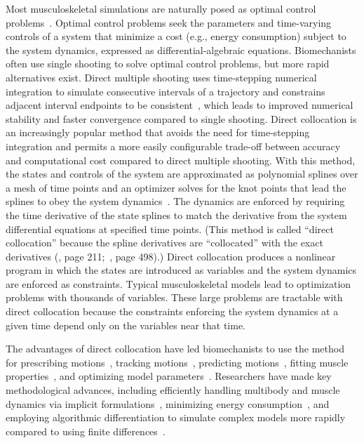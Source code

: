 \documentclass[10pt,letterpaper]{article}
\begin{document}
Most musculoskeletal simulations are naturally posed as optimal control problems~\cite{Todorov:2003}. Optimal control problems seek the parameters and time-varying controls of a system that minimize a cost (e.g., energy consumption) subject to the system dynamics, expressed as differential-algebraic equations. Biomechanists often use single shooting to solve optimal control problems, but more rapid alternatives exist. Direct multiple shooting uses time-stepping numerical integration to simulate consecutive intervals of a trajectory and constrains adjacent interval endpoints to be consistent~\cite{Bock:1984, Leineweber:2003}, which leads to improved numerical stability and faster convergence compared to single shooting. Direct collocation is an increasingly popular method that avoids the need for time-stepping integration and permits a more easily configurable trade-off between accuracy and computational cost compared to direct multiple shooting. With this method, the states and controls of the system are approximated as polynomial splines over a mesh of time points and an optimizer solves for the knot points that lead the splines to obey the system dynamics~\cite{Betts:2010, Kelly:2017, Hargraves:1987, vonStryk:1993}. The dynamics are enforced by requiring the time derivative of the state splines to match the derivative from the system differential equations at specified time points. (This method is called ``direct collocation'' because the spline derivatives are ``collocated'' with the exact derivatives (\hspace{1sp}\cite{Hairer:1993}, page 211;~\cite{Hairer:1996}, page 498).) Direct collocation produces a nonlinear program in which the states are introduced as variables and the system dynamics are enforced as constraints. Typical musculoskeletal models lead to optimization problems with thousands of variables. These large problems are tractable with direct collocation because the constraints enforcing the system dynamics at a given time depend only on the variables near that time.

The advantages of direct collocation have led biomechanists to use the method for prescribing motions~\cite{Groote:2016dq,Ueno:2020}, tracking motions~\cite{Kaplan:2001,Lin:2017jp,Mehrabi:2019,Koelewijn:2016bm,Meyer:2016gl}, predicting motions~\cite{Ackermann:2010dd,Ackermann:2012,Miller:2015fc,Porsa:2015dn,Lee:2016dn,Umberger:2018ec,Bobbert:2016,KMoore:2018ea,Lin:2018ex,Lai:2018,Nguyen:2019,Falisse:2019b,Jansen:2020}, fitting muscle properties~\cite{Falisse:2017}, and optimizing model parameters~\cite{Rohani:2017}. Researchers have made key methodological advances, including efficiently handling multibody and muscle dynamics via implicit formulations~\cite{vandenBogert:2011fv,Groote:2016dq}, minimizing energy consumption~\cite{Koelewijn:2018kw,Koelewijn:2019}, and employing algorithmic differentiation to simulate complex models more rapidly compared to using finite differences~\cite{Falisse:2019a}.
\end{document}
